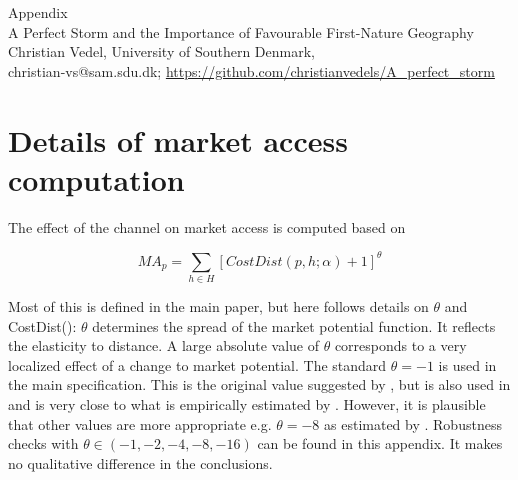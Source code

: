 \setcounter{table}{0}
\setcounter{figure}{0}
\setcounter{section}{0}
\renewcommand*{\thesection}{\Alph{section}}
\renewcommand{\thefigure}{A\arabic{figure}}
\renewcommand{\thetable}{A\arabic{table}}


\begin{title}

    \begin{center}
        
        \Huge
        Appendix \\
        \LARGE
        A Perfect Storm and the Importance of Favourable First-Nature Geography \\
        
        \vspace{0.5cm}
        \Large
        Christian Vedel, University of Southern Denmark,\\
        \small
        christian-vs@sam.sdu.dk; 
        \url{https://github.com/christianvedels/A_perfect_storm}
        
    \end{center}

    \localtableofcontents %
        
    \vfill
    
\end{title}


\section{Details of market access computation}

The effect of the channel on market access is computed based on 

\begin{equation}
\label{eq:MA2}
{MA}_p = \sum_{h \in H} [CostDist(p, h; \alpha) + 1]^\theta
\end{equation}

Most of this is defined in the main paper, but here follows details on $\theta$ and CostDist(): $\theta$ determines the spread of the market potential function. It reflects the elasticity to distance. A large absolute value of $\theta$ corresponds to a very localized effect of a change to market potential. The standard $\theta = -1$ is used in the main specification.  This is the original value suggested by \cite{Harris1954}, but is also used in \cite{rauch2022a} and is very close to what is empirically estimated by \cite{Redding2008}. However, it is plausible that other values are more appropriate e.g. $\theta = -8$ as estimated by \cite{Donaldson2016}. Robustness checks with $\theta \in (-1, -2, -4, -8, -16)$ can be found in this appendix. It makes no qualitative difference in the conclusions.  

